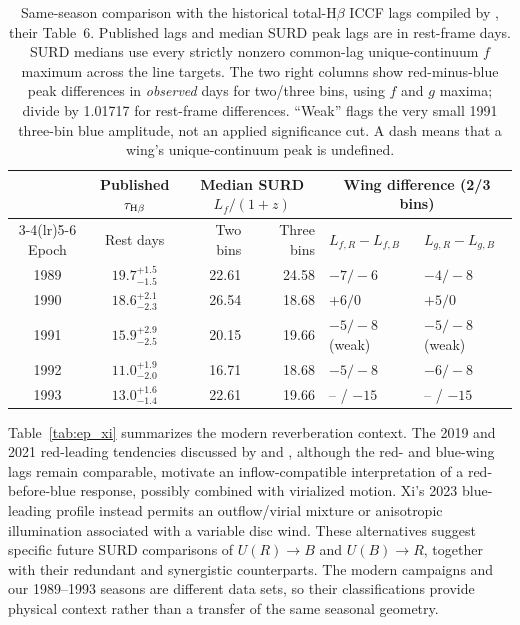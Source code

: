 \documentclass[fleqn,usenatbib]{mnras}
\newenvironment{SURDtable}{\begin{table}}{\end{table}}
\begin{document}
\begin{SURDtable}
\centering
\caption{Same-season comparison with the historical total-H$\beta$ ICCF lags compiled by \citet{Lu2022}, their Table~6. Published lags and median SURD peak lags are in rest-frame days. SURD medians use every strictly nonzero common-lag unique-continuum $f$ maximum across the line targets. The two right columns show red-minus-blue peak differences in \emph{observed} days for two/three bins, using $f$ and $g$ maxima; divide by 1.01717 for rest-frame differences. ``Weak'' flags the very small 1991 three-bin blue amplitude, not an applied significance cut. A dash means that a wing's unique-continuum peak is undefined.}
\label{tab:ep_lu}
\small
\begin{tabular}{ccrrll}
\toprule
& Published $\tau_{\rm H\beta}$ & \multicolumn{2}{c}{Median SURD $L_f/(1+z)$} & \multicolumn{2}{c}{Wing difference (2/3 bins)} \\ \cmidrule(lr){3-4}\cmidrule(lr){5-6} Epoch & Rest days & Two bins & Three bins & $L_{f,R}-L_{f,B}$ & $L_{g,R}-L_{g,B}$ \\
\midrule
1989 & $19.7^{+1.5}_{-1.5}$ & 22.61 & 24.58 & $-7/-6$ & $-4/-8$ \\
1990 & $18.6^{+2.1}_{-2.3}$ & 26.54 & 18.68 & $+6/0$ & $+5/0$ \\
1991 & $15.9^{+2.9}_{-2.5}$ & 20.15 & 19.66 & $-5/-8$ (weak) & $-5/-8$ (weak) \\
1992 & $11.0^{+1.9}_{-2.0}$ & 16.71 & 18.68 & $-5/-8$ & $-6/-8$ \\
1993 & $13.0^{+1.6}_{-1.4}$ & 22.61 & 19.66 & -- / $-15$ & -- / $-15$ \\
\bottomrule
\end{tabular}
\end{SURDtable}

Table~\ref{tab:ep_xi} summarizes the modern reverberation context. The 2019 and 2021 red-leading tendencies discussed by \citet{Lu2022} and \citet{Xi2025}, although the red- and blue-wing lags remain comparable, motivate an inflow-compatible interpretation of a red-before-blue response, possibly combined with virialized motion. Xi's 2023 blue-leading profile instead permits an outflow/virial mixture or anisotropic illumination associated with a variable disc wind. These alternatives suggest specific future SURD comparisons of $U(R)\to B$ and $U(B)\to R$, together with their redundant and synergistic counterparts. The modern campaigns and our 1989--1993 seasons are different data sets, so their classifications provide physical context rather than a transfer of the same seasonal geometry.
\end{document}
